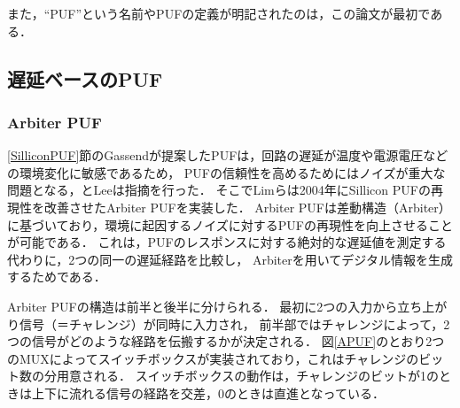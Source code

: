 \documentclass[technicalreport]{ieicej} %
\begin{document}
また，“PUF”という名前やPUFの定義が明記されたのは，この論文が最初である．

\subsection{遅延ベースのPUF}
\subsubsection{Arbiter PUF}
\ref{SilliconPUF}節のGassendが提案したPUFは，回路の遅延が温度や電源電圧などの環境変化に敏感であるため，
PUFの信頼性を高めるためにはノイズが重大な問題となる，とLeeは指摘を行った\cite{lee}．
そこでLimらは2004年にSillicon PUFの再現性を改善させたArbiter PUF\cite{lim}を実装した．
Arbiter PUFは差動構造（Arbiter）に基づいており，環境に起因するノイズに対するPUFの再現性を向上させることが可能である．
これは，PUFのレスポンスに対する絶対的な遅延値を測定する代わりに，2つの同一の遅延経路を比較し，
Arbiterを用いてデジタル情報を生成するためである．

Arbiter PUFの構造は前半と後半に分けられる．
最初に2つの入力から立ち上がり信号（＝チャレンジ）が同時に入力され，
前半部ではチャレンジによって，2つの信号がどのような経路を伝搬するかが決定される．
図\ref{APUF}のとおり2つのMUXによってスイッチボックスが実装されており，これはチャレンジのビット数の分用意される．
スイッチボックスの動作は，チャレンジのビットが1のときは上下に流れる信号の経路を交差，0のときは直進となっている．
\end{document}
